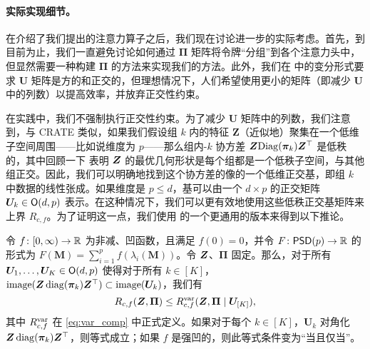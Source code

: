 \documentclass[../../book-main_zh.tex]{subfiles}
\begin{document}
\paragraph{实际实现细节。} 在介绍了我们提出的注意力算子之后，我们现在讨论进一步的实际考虑。首先，到目前为止，我们一直避免讨论如何通过 $\bm\Pi$ 矩阵将令牌“分组”到各个注意力头中，但显然需要一种构建 $\bm\Pi$ 的方法来实现我们的方法。此外，我们在  中的变分形式要求 $\bm U$ 矩阵是方的和正交的，但理想情况下，人们希望使用更小的矩阵（即减少 $\bm U$ 中的列数）以提高效率，并放弃正交性约束。

在实践中，我们不强制执行正交性约束。为了减少 $\bm U$ 矩阵中的列数，我们注意到，与 CRATE \citep{yu2023white} 类似，如果我们假设组 \(k\) 内的特征 $\bm Z$（近似地）聚集在一个低维子空间周围——比如说维度为 \(p\)——那么组内-\(k\) 协方差 \(\bm{Z}\mathrm{Diag}(\bm \pi_{k})\bm{Z}^{\top}\) 是低秩的，其中回顾一下 \cite{yu2020learning} 表明 $\bm{Z}$ 的最优几何形状是每个组都是一个低秩子空间，与其他组正交。因此，我们可以明确地找到这个协方差的像的一个低维正交基，即组 \(k\) 中数据的线性张成。如果维度是 $p \leq d$，基可以由一个 $d\times p$ 的正交矩阵 $\bm U_k \in \mathsf{O}(d, p)$ 表示。在这种情况下，我们可以更有效地使用这些低秩正交基矩阵来上界 \(R_{c,f}\)。为了证明这一点，我们使用  的一个更通用的版本来得到以下推论。
\begin{corollary}\label{cor:var_concave_logdet}
    令 \(f \colon [0, \infty) \to \mathbb{R}\) 为非减、凹函数，且满足 \(f(0) = 0\)，并令 \(F \colon \mathsf{PSD}(p) \to \mathbb{R}\) 的形式为 \(F(\bm M) = \sum_{i = 1}^{p}f(\lambda_{i}(\bm M))\)。令 \(\bm{Z}\)、\(\bm \Pi\) 固定。那么，对于所有 \(\bm U_{1}, \dots, \bm U_{K} \in \mathsf{O}(d, p)\) 使得对于所有 \(k \in [K]\)，\(\mathrm{image}(\bm{Z}\operatorname{diag}(\bm \pi_{k})\bm{Z}^{\top}) \subset \mathrm{image}(\bm U_{k})\)，我们有
    \begin{equation}
        R_{c, f}(\bm{Z}, \bm\Pi) \leq R_{c, f}^{\rm var}(\bm{Z}, \bm\Pi \mid \bm U_{[K]}),
    \end{equation}
     其中 \(R_{c, f}^{\rm var}\) 在 \eqref{eq:var_comp} 中正式定义。如果对于每个 \(k \in [K]\)，\(\bm U_{k}\) 对角化 \(\bm{Z}\operatorname{diag}(\bm \pi_{k})\bm{Z}^{\top}\)，则等式成立；如果 \(f\) 是强凹的，则此等式条件变为“当且仅当”。
\end{corollary}
\end{document}
